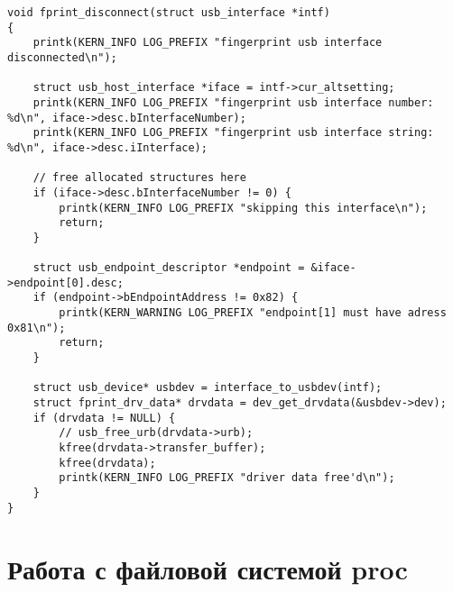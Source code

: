 \begin{lstlisting}[caption={функция \texttt{disconnect} драйвера}]
void fprint_disconnect(struct usb_interface *intf)
{
    printk(KERN_INFO LOG_PREFIX "fingerprint usb interface disconnected\n");

    struct usb_host_interface *iface = intf->cur_altsetting;
    printk(KERN_INFO LOG_PREFIX "fingerprint usb interface number: %d\n", iface->desc.bInterfaceNumber);
    printk(KERN_INFO LOG_PREFIX "fingerprint usb interface string: %d\n", iface->desc.iInterface);

    // free allocated structures here
    if (iface->desc.bInterfaceNumber != 0) {
        printk(KERN_INFO LOG_PREFIX "skipping this interface\n");
        return;
    }

    struct usb_endpoint_descriptor *endpoint = &iface->endpoint[0].desc;
    if (endpoint->bEndpointAddress != 0x82) {
        printk(KERN_WARNING LOG_PREFIX "endpoint[1] must have adress 0x81\n");
        return;
    }

    struct usb_device* usbdev = interface_to_usbdev(intf);
    struct fprint_drv_data* drvdata = dev_get_drvdata(&usbdev->dev);
    if (drvdata != NULL) {
        // usb_free_urb(drvdata->urb);
        kfree(drvdata->transfer_buffer);
        kfree(drvdata);
        printk(KERN_INFO LOG_PREFIX "driver data free'd\n");
    }
}
\end{lstlisting}

\section{Работа с файловой системой proc}

